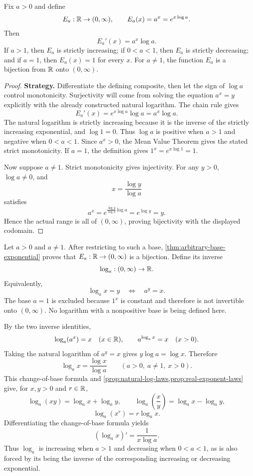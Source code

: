 \begin{theorem}
\label{thm:arbitrary-base-exponential}
Fix $a>0$ and define
\[
E_a:\mathbb{R}\to(0,\infty),
\qquad E_a(x)=a^x=e^{x\log a}.
\]
Then
\[
\boxed{E_a'(x)=a^x\log a.}
\]
If $a>1$, then $E_a$ is strictly increasing; if $0<a<1$, then $E_a$ is
strictly decreasing; and if $a=1$, then $E_a(x)=1$ for every $x$.
For $a\ne1$, the function $E_a$ is a bijection from $\mathbb{R}$ onto
$(0,\infty)$.
\end{theorem}
\begin{proof}
\textbf{Strategy.} Differentiate the defining composite, then let the sign of
$\log a$ control monotonicity. Surjectivity will come from solving the
equation $a^x=y$ explicitly with the already constructed natural logarithm.
The chain rule gives
\[
E_a'(x)=e^{x\log a}\log a=a^x\log a.
\]
The natural logarithm is strictly increasing because it is the inverse of
the strictly increasing exponential, and $\log1=0$. Thus $\log a$ is
positive when $a>1$ and negative when $0<a<1$. Since $a^x>0$, the Mean
Value Theorem gives the stated strict monotonicity. If $a=1$, the definition
gives $1^x=e^{x\log1}=1$.

Now suppose $a\ne1$. Strict monotonicity gives injectivity. For any $y>0$,
$\log a\ne0$, and
\[
x=\frac{\log y}{\log a}
\]
satisfies
\[
a^x=e^{\frac{\log y}{\log a}\log a}
=e^{\log y}=y.
\]
Hence the actual range is all of $(0,\infty)$, proving bijectivity with the
displayed codomain.
\end{proof}

\begin{definition}
\label{def:arbitrary-base-logarithm}
Let $a>0$ and $a\ne1$. After restricting to such a base,
\cref{thm:arbitrary-base-exponential} proves that
$E_a:\mathbb{R}\to(0,\infty)$ is a bijection. Define its inverse
\[
\log_a:(0,\infty)\to\mathbb{R}.
\]
Equivalently,
\[
\boxed{\log_a x=y\quad\Longleftrightarrow\quad a^y=x.}
\]
The base $a=1$ is excluded because $1^x$ is constant and therefore is not
invertible onto $(0,\infty)$. No logarithm with a nonpositive base is being
defined here.
\end{definition}

By the two inverse identities,
\[
\log_a(a^x)=x\quad(x\in\mathbb{R}),
\qquad
a^{\log_a x}=x\quad(x>0).
\]
Taking the natural logarithm of $a^y=x$ gives
$y\log a=\log x$. Therefore
\[
\boxed{\log_a x=\frac{\log x}{\log a}}
\qquad(a>0,\ a\ne1,\ x>0).
\]
This change-of-base formula and \cref{prop:natural-log-laws,prop:real-exponent-laws}
give, for $x,y>0$ and $r\in\mathbb{R}$,
\[
\log_a(xy)=\log_a x+\log_a y,
\qquad
\log_a\!\left(\frac xy\right)=\log_a x-\log_a y,
\]
\[
\log_a(x^r)=r\log_a x.
\]
Differentiating the change-of-base formula yields
\[
\boxed{(\log_a x)'=\frac1{x\log a}.}
\]
Thus $\log_a$ is increasing when $a>1$ and decreasing when $0<a<1$,
as is also forced by its being the inverse of the corresponding increasing
or decreasing exponential.

